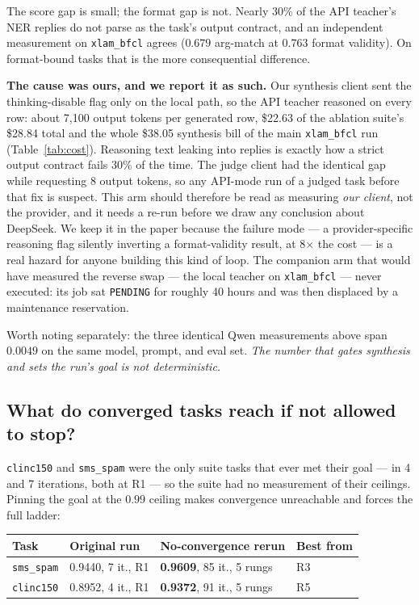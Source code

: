 \documentclass[sigconf,10pt]{acmart}
\newcommand{\tsk}[1]{\texttt{#1}}
\begin{document}
The score gap is small; the format gap is not. Nearly 30\% of the API teacher's NER replies do
not parse as the task's output contract, and an independent measurement on \tsk{xlam\_bfcl}
agrees ($0.679$ arg-match at $0.763$ format validity). On format-bound tasks that is the more
consequential difference.

\textbf{The cause was ours, and we report it as such.} Our synthesis client sent the
thinking-disable flag only on the local path, so the API teacher reasoned on every row: about
7{,}100 output tokens per generated row, \$22.63 of the ablation suite's \$28.84 total and the
whole \$38.05 synthesis bill of the main \tsk{xlam\_bfcl} run (Table~\ref{tab:cost}). Reasoning
text leaking into replies is exactly how a strict output contract fails 30\% of the time. The
judge client had the identical gap while requesting 8 output tokens, so any API-mode run of a
judged task before that fix is suspect. This arm should therefore be read as measuring
\emph{our client}, not the provider, and it needs a re-run before we draw any conclusion about
DeepSeek. We keep it in the paper because the failure mode --- a provider-specific reasoning
flag silently inverting a format-validity result, at 8$\times$ the cost --- is a real hazard
for anyone building this kind of loop. The companion arm that would have measured the
reverse swap --- the local teacher on \tsk{xlam\_bfcl} --- never executed: its job sat
\texttt{PENDING} for roughly 40 hours and was then displaced by a maintenance reservation.

Worth noting separately: the three identical Qwen measurements above span $0.0049$ on the same
model, prompt, and eval set. \emph{The number that gates synthesis and sets the run's goal is
not deterministic.}

\subsection{What do converged tasks reach if not allowed to stop?}
\label{sec:ablations-nostop}

\tsk{clinc150} and \tsk{sms\_spam} were the only suite tasks that ever met their goal --- in 4
and 7 iterations, both at R1 --- so the suite had no measurement of their ceilings. Pinning
the goal at the $0.99$ ceiling makes convergence unreachable and forces the full ladder:

\begin{center}
\small
\begin{tabular}{@{}llll@{}}
\toprule
Task & Original run & No-convergence rerun & Best from \\
\midrule
\tsk{sms\_spam} & 0.9440, 7 it., R1 & \textbf{0.9609}, 85 it., 5 rungs & R3 \\
\tsk{clinc150}  & 0.8952, 4 it., R1 & \textbf{0.9372}, 91 it., 5 rungs & R5 \\
\bottomrule
\end{tabular}
\end{center}
\end{document}
